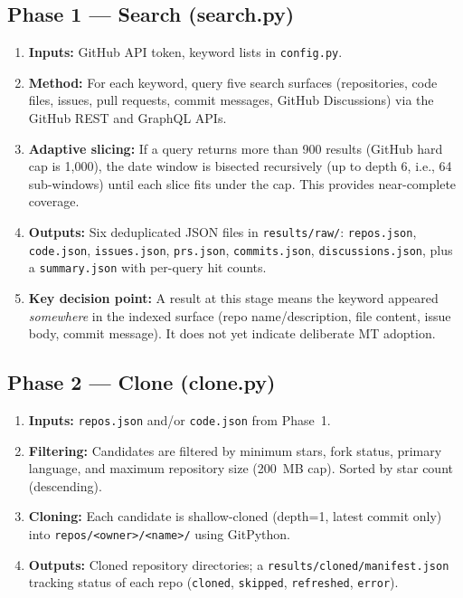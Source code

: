 \documentclass[12pt,a4paper]{article}
\begin{document}
\subsection{Phase 1 --- Search (search.py)}

\begin{enumerate}
  \item \textbf{Inputs:} GitHub API token, keyword lists in \texttt{config.py}.
  \item \textbf{Method:} For each keyword, query five search surfaces
        (repositories, code files, issues, pull requests, commit messages,
        GitHub Discussions) via the GitHub REST and GraphQL APIs.
  \item \textbf{Adaptive slicing:} If a query returns more than 900 results
        (GitHub hard cap is 1,000), the date window is bisected recursively
        (up to depth 6, i.e., 64 sub-windows) until each slice fits under the
        cap. This provides near-complete coverage.
  \item \textbf{Outputs:} Six deduplicated JSON files in \texttt{results/raw/}:
        \texttt{repos.json}, \texttt{code.json}, \texttt{issues.json},
        \texttt{prs.json}, \texttt{commits.json}, \texttt{discussions.json},
        plus a \texttt{summary.json} with per-query hit counts.
  \item \textbf{Key decision point:} A result at this stage means the keyword
        appeared \emph{somewhere} in the indexed surface (repo name/description,
        file content, issue body, commit message). It does not yet indicate
        deliberate MT adoption.
\end{enumerate}

\subsection{Phase 2 --- Clone (clone.py)}

\begin{enumerate}
  \item \textbf{Inputs:} \texttt{repos.json} and/or \texttt{code.json} from
        Phase~1.
  \item \textbf{Filtering:} Candidates are filtered by minimum stars, fork
        status, primary language, and maximum repository size (200~MB cap).
        Sorted by star count (descending).
  \item \textbf{Cloning:} Each candidate is shallow-cloned (depth=1, latest
        commit only) into \texttt{repos/<owner>/<name>/} using GitPython.
  \item \textbf{Outputs:} Cloned repository directories; a
        \texttt{results/cloned/manifest.json} tracking status of each repo
        (\texttt{cloned}, \texttt{skipped}, \texttt{refreshed}, \texttt{error}).
\end{enumerate}
\end{document}
